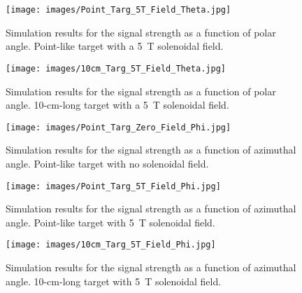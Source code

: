 \begin{figure}[!ht]
    \centering
    \texttt{[image: images/Point\_Targ\_5T\_Field\_Theta.jpg]}
    \caption{Simulation results for the signal strength as a function of polar angle. Point-like target with a 5~T
      solenoidal field.}
    \label{fig:Point_Targ_5T_Field_Theta}
\end{figure}

\begin{figure}[!ht]
    \centering
    \texttt{[image: images/10cm\_Targ\_5T\_Field\_Theta.jpg]}
    \caption{Simulation results for the signal strength as a function of polar angle. 10-cm-long target with a 5~T
      solenoidal field.}
    \label{fig:10cm_Targ_5T_Field_Theta}
\end{figure}

\begin{figure}[!ht]
    \centering
    \texttt{[image: images/Point\_Targ\_Zero\_Field\_Phi.jpg]}
    \caption{Simulation results for the signal strength as a function of azimuthal angle. Point-like target with no
      solenoidal field.}
    \label{fig:Point_Targ_Zero_Field_Phi}
\end{figure}

\begin{figure}[!ht]
    \centering
    \texttt{[image: images/Point\_Targ\_5T\_Field\_Phi.jpg]}
    \caption{Simulation results for the signal strength as a function of azimuthal angle. Point-like target with 5~T
      solenoidal field.}
    \label{fig:Point_Targ_5T_Field_Phi}
\end{figure}

\begin{figure}[!ht]
    \centering
    \texttt{[image: images/10cm\_Targ\_5T\_Field\_Phi.jpg]}
    \caption{Simulation results for the signal strength as a function of azimuthal angle. 10-cm-long target with 5~T
      solenoidal field.}
    \label{fig:10cm_Targ_5T_Field_Phi}
\end{figure}

